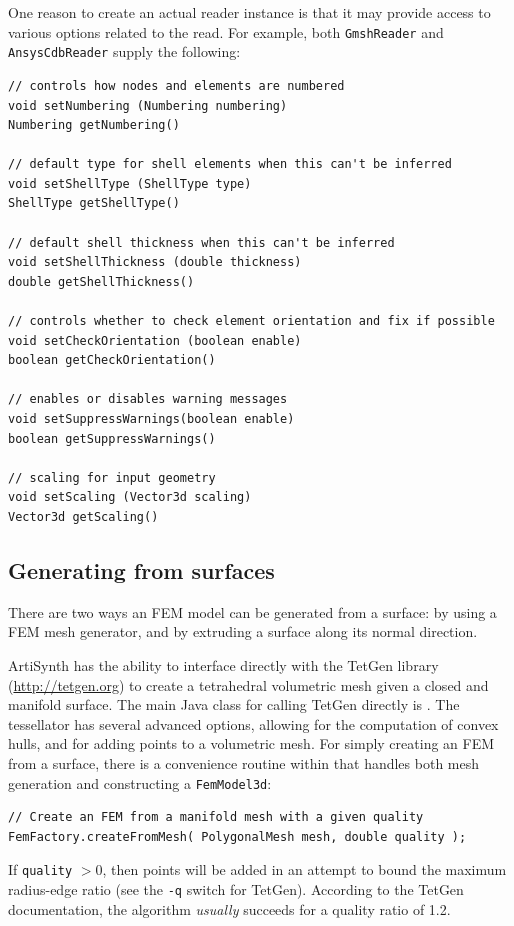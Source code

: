 One reason to create an actual reader instance is that it may provide access to
various options related to the read. For example, both {\tt GmshReader} and
{\tt AnsysCdbReader} supply the following:
%
\begin{lstlisting}[]
// controls how nodes and elements are numbered
void setNumbering (Numbering numbering)
Numbering getNumbering()

// default type for shell elements when this can't be inferred
void setShellType (ShellType type)
ShellType getShellType()

// default shell thickness when this can't be inferred
void setShellThickness (double thickness)
double getShellThickness()

// controls whether to check element orientation and fix if possible
void setCheckOrientation (boolean enable)
boolean getCheckOrientation() 

// enables or disables warning messages
void setSuppressWarnings(boolean enable)
boolean getSuppressWarnings()

// scaling for input geometry
void setScaling (Vector3d scaling)
Vector3d getScaling()
\end{lstlisting}
%

\subsection{Generating from surfaces}

There are two ways an FEM model can be generated from a surface: by using a
FEM mesh generator, and by extruding a surface along its normal direction.

ArtiSynth has the ability to interface directly with the TetGen library 
(\href{http://tetgen.org}{http://tetgen.org}) to create a tetrahedral 
volumetric mesh given a closed and manifold surface.  The main Java class for
calling TetGen directly is .
The tessellator has several advanced options, allowing for the computation of 
convex hulls, and for adding points to a volumetric mesh.  For simply creating
an FEM from a surface, there is a convenience routine within 
 that handles both mesh 
generation and constructing a {\tt FemModel3d}:
\begin{lstlisting}[]
// Create an FEM from a manifold mesh with a given quality
FemFactory.createFromMesh( PolygonalMesh mesh, double quality );
\end{lstlisting}
If {\tt quality} $>0$, then points will be added in an attempt to bound the
maximum radius-edge ratio (see the {\tt-q} switch for TetGen).  According
to the TetGen documentation, the algorithm \emph{usually} succeeds for a 
quality ratio of 1.2.

